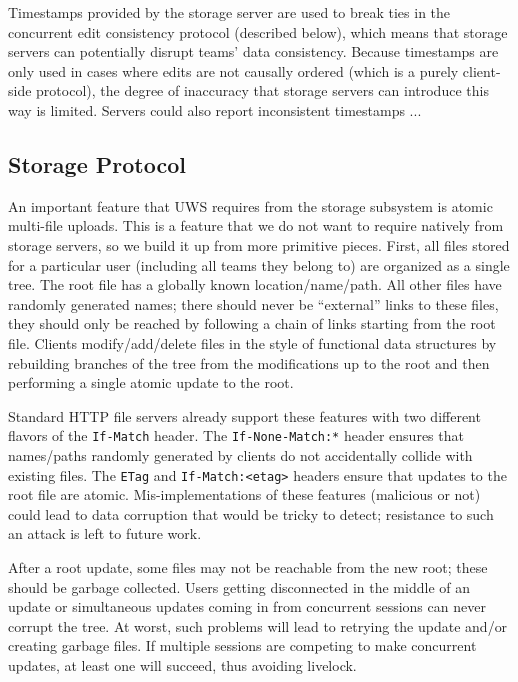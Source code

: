 \documentclass[runningheads]{llncs}
\begin{document}
Timestamps provided by the storage server are used to break ties in the concurrent edit consistency protocol (described below), which means that storage servers can potentially disrupt teams' data consistency.
Because timestamps are only used in cases where edits are not causally ordered (which is a purely client-side protocol), the degree of inaccuracy that storage servers can introduce this way is limited.
Servers could also report inconsistent timestamps ...

\subsection{Storage Protocol}

An important feature that UWS requires from the storage subsystem is atomic multi-file uploads.
This is a feature that we do not want to require natively from storage servers, so we build it up from more primitive pieces.
First, all files stored for a particular user (including all teams they belong to) are organized as a single tree.
The root file has a globally known location{\slash}name{\slash}path.
All other files have randomly generated names; there should never be ``external'' links to these files, they should only be reached by following a chain of links starting from the root file.
Clients modify{\slash}add{\slash}delete files in the style of functional data structures by rebuilding branches of the tree from the modifications up to the root and then performing a single atomic update to the root.

Standard HTTP file servers already support these features with two different flavors of the \texttt{If-Match} header.
The \texttt{If-None-Match:*} header ensures that names{\slash}paths randomly generated by clients do not accidentally collide with existing files.
The \texttt{ETag} and \texttt{If-Match:<etag>} headers ensure that updates to the root file are atomic.
Mis-implementations of these features (malicious or not) could lead to data corruption that would be tricky to detect; resistance to such an attack is left to future work.

After a root update, some files may not be reachable from the new root; these should be garbage collected.
Users getting disconnected in the middle of an update or simultaneous updates coming in from concurrent sessions can never corrupt the tree.
At worst, such problems will lead to retrying the update and{\slash}or creating garbage files.
If multiple sessions are competing to make concurrent updates, at least one will succeed, thus avoiding livelock.
\end{document}
